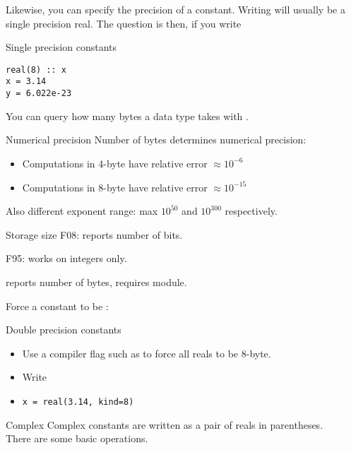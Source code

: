 Likewise, you can specify the precision of a constant.
Writing  will usually be a single precision
real. The question is then, if you write
\begin{block}{Single precision constants}
  \label{sl:fsingle}
\begin{verbatim}
real(8) :: x
x = 3.14
y = 6.022e-23
\end{verbatim}
\end{block}

You can query how many bytes a data type takes with
.

\begin{block}{Numerical precision}
  \label{sl:fprecision48}
  Number of bytes determines numerical precision:
  \begin{itemize}
  \item Computations in 4-byte have relative error $\approx 10^{-6}$
  \item Computations in 8-byte have relative error $\approx 10^{-15}$
  \end{itemize}
  Also different exponent range: max $10^{50}$ and $10^{300}$ respectively.
\end{block}

\begin{block}{Storage size}
  F08:  reports number of bits.

  F95:  works on integers only.

   reports number of bytes, requires
   module.
\end{block}

Force a constant to be :
\begin{block}{Double precision constants}
  \label{sl:fdouble}
  \begin{itemize}
  \item Use a compiler flag such as  to force all reals to be 8-byte.
  \item Write 
  \item \verb+x = real(3.14, kind=8)+
  \end{itemize}
\end{block}

\begin{block}{Complex}
  \label{sl:fcomplex}
  Complex constants are written as a pair of reals in parentheses.\\
  There are some basic operations.
\end{block}

